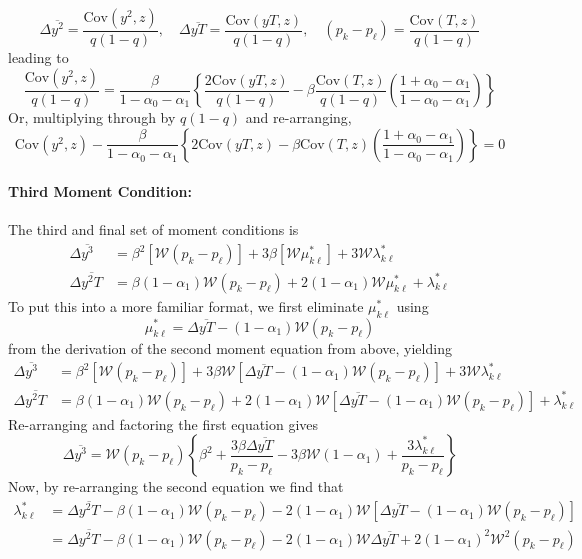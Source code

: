 \documentclass[12pt]{article}
\begin{document}
\[
  \Delta\overline{y^2} = \frac{\mbox{Cov}(y^2,z)}{q(1 - q)}, \quad
  \Delta\overline{yT} = \frac{\mbox{Cov}(yT,z)}{q(1 - q)}, \quad
  (p_k - p_\ell) = \frac{\mbox{Cov}(T,z)}{q(1 - q)}
\]
leading to
\[\frac{\mbox{Cov}(y^2,z)}{q(1-q)}= \frac{\beta}{1 - \alpha_0 - \alpha_1}\left\{\frac{2\mbox{Cov}(yT,z)}{q(1-q)} - \beta \frac{\mbox{Cov}(T,z)}{q(1-q)}\left( \frac{1 + \alpha_0 - \alpha_1}{1 - \alpha_0 - \alpha_1} \right)  \right\}
\]
Or, multiplying through by $q(1-q)$ and re-arranging,
\[
  \mbox{Cov}(y^2,z) - \frac{\beta}{1 - \alpha_0 - \alpha_1}\left\{2\mbox{Cov}(yT,z)- \beta \mbox{Cov}(T,z)\left( \frac{1 + \alpha_0 - \alpha_1}{1 - \alpha_0 - \alpha_1} \right)  \right\} = 0
\]

\paragraph{Third Moment Condition:}
The third and final set of moment conditions is
\begin{align*}
    \Delta\overline{y^3} &= \beta^2 [\mathcal{W} (p_k - p_\ell)]  + 3 \beta [\mathcal{W} \mu_{k\ell}^*] + 3 \mathcal{W} \lambda^*_{k\ell}\\
    \Delta\overline{y^2T} &=  \beta(1-\alpha_1)\mathcal{W}(p_k - p_\ell) + 2(1-\alpha_1)\mathcal{W}\mu_{k\ell}^* + \lambda_{k\ell}^*
\end{align*}
  To put this into a more familiar format, we first eliminate $\mu_{k\ell}^*$ using 
\[
  \mu_{k\ell}^* = \Delta \overline{yT} - (1 - \alpha_1) \mathcal{W} (p_k - p_\ell)
\]
from the derivation of the second moment equation from above, yielding
\begin{align*}
  \Delta\overline{y^3} &= \beta^2 [\mathcal{W} (p_k - p_\ell)]  + 3 \beta \mathcal{W}\left[ \Delta \overline{yT} - (1 - \alpha_1) \mathcal{W} (p_k - p_\ell) \right]  + 3 \mathcal{W} \lambda^*_{k\ell}\\
    \Delta\overline{y^2T} &=  \beta(1-\alpha_1)\mathcal{W}(p_k - p_\ell) + 2(1-\alpha_1)\mathcal{W}\left[ \Delta \overline{yT} - (1 - \alpha_1) \mathcal{W} (p_k - p_\ell) \right] + \lambda_{k\ell}^*
\end{align*}
Re-arranging and factoring the first equation gives
\[
  \Delta\overline{y^3} = \mathcal{W}\left( p_k - p_\ell \right)
  \left\{ \beta^2 + \frac{3\beta \Delta\overline{yT}}{p_k - p_\ell} - 3\beta \mathcal{W} (1 - \alpha_1) + \frac{3\lambda^*_{k\ell}}{p_k - p_\ell} \right\}
\]
Now, by re-arranging the second equation we find that
\begin{align*}
  \lambda_{k\ell}^* &= \Delta\overline{y^2T} -  \beta(1-\alpha_1)\mathcal{W}(p_k - p_\ell) - 2(1-\alpha_1)\mathcal{W}\left[ \Delta \overline{yT} - (1 - \alpha_1) \mathcal{W} (p_k - p_\ell) \right] \\
  &= \Delta\overline{y^2T} -  \beta(1-\alpha_1)\mathcal{W}(p_k - p_\ell) - 2(1-\alpha_1)\mathcal{W} \Delta \overline{yT} + 2(1-\alpha_1)^2\mathcal{W}^2(p_k - p_\ell)
\end{align*}
\end{document}
